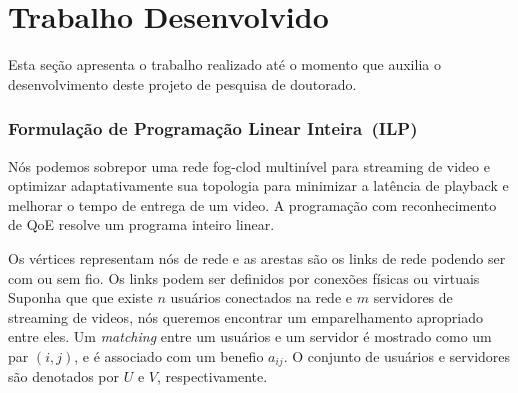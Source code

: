 \clearpage
\section{Trabalho Desenvolvido}
\label{ch:developed}

Esta seção apresenta o trabalho realizado até o momento que auxilia o desenvolvimento 
deste projeto de pesquisa de doutorado. 



%

\subsubsection{Formulação de Programação Linear Inteira~(ILP)}
\label{subsec:applications}

Nós podemos sobrepor uma rede fog-clod multinível para streaming de video e optimizar adaptativamente sua topologia para minimizar a latência de playback e melhorar o tempo de entrega de um video. A programação com reconhecimento de QoE resolve um programa inteiro linear.

Os vértices representam nós de rede e as arestas são os links de rede podendo ser com ou sem fio. Os links podem ser definidos por conexões físicas ou virtuais
Suponha que que existe $n$ usuários conectados na rede e $m$ servidores de streaming de videos, nós queremos encontrar um emparelhamento apropriado entre eles. Um \textit{matching} entre um usuários e um servidor é mostrado como um par $(i,j)$, e é associado com um benefio $a_{ij}$. O conjunto de usuários e servidores são denotados por $U$ e $V$, respectivamente.

